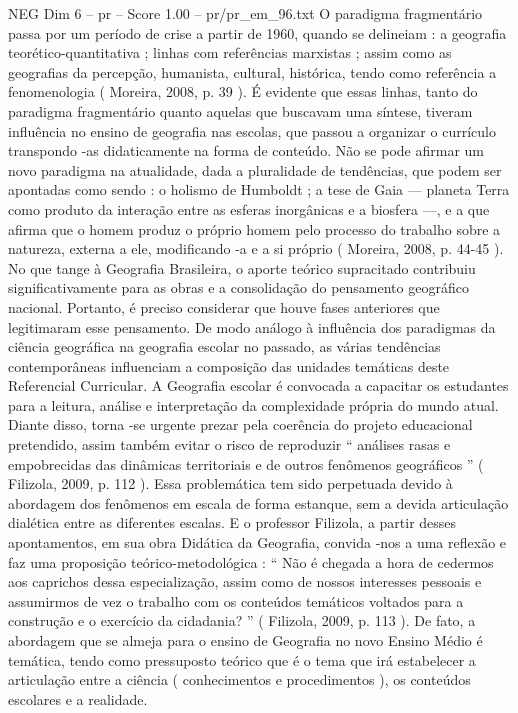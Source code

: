 \begin{textsample}{NEG Dim 6 – pr – Score 1.00 – pr/pr\_em\_96.txt}
O paradigma fragmentário passa por um período de crise a partir de 1960, quando se delineiam : a geografia teorético-quantitativa ; linhas com referências marxistas ; assim como as geografias da percepção, humanista, cultural, histórica, tendo como referência a fenomenologia ( Moreira, 2008, p. 39 ).
É evidente que essas linhas, tanto do paradigma fragmentário quanto aquelas que buscavam uma síntese, tiveram influência no ensino de geografia nas escolas, que passou a organizar o currículo transpondo -as didaticamente na forma de conteúdo.
Não se pode afirmar um novo paradigma na atualidade, dada a pluralidade de tendências, que podem ser apontadas como sendo : o holismo de Humboldt ; a tese de Gaia — planeta Terra como produto da interação entre as esferas inorgânicas e a biosfera —, e a que afirma que o homem produz o próprio homem pelo processo do trabalho sobre a natureza, externa a ele, modificando -a e a si próprio ( Moreira, 2008, p. 44-45 ).
No que tange à Geografia Brasileira, o aporte teórico supracitado contribuiu significativamente para as obras e a consolidação do pensamento geográfico nacional.
Portanto, é preciso considerar que houve fases anteriores que legitimaram esse pensamento.
De modo análogo à influência dos paradigmas da ciência geográfica na geografia escolar no passado, as várias tendências contemporâneas influenciam a composição das unidades temáticas deste Referencial Curricular.
A Geografia escolar é convocada a capacitar os estudantes para a leitura, análise e interpretação da complexidade própria do mundo atual.
Diante disso, torna -se urgente prezar pela coerência do projeto educacional pretendido, assim também evitar o risco de reproduzir “ análises rasas e empobrecidas das dinâmicas territoriais e de outros fenômenos geográficos ” ( Filizola, 2009, p. 112 ).
Essa problemática tem sido perpetuada devido à abordagem dos fenômenos em escala de forma estanque, sem a devida articulação dialética entre as diferentes escalas.
E o professor Filizola, a partir desses apontamentos, em sua obra Didática da Geografia, convida -nos a uma reflexão e faz uma proposição teórico-metodológica : “ Não é chegada a hora de cedermos aos caprichos dessa especialização, assim como de nossos interesses pessoais e assumirmos de vez o trabalho com os conteúdos temáticos voltados para a construção e o exercício da cidadania? ” ( Filizola, 2009, p. 113 ).
De fato, a abordagem que se almeja para o ensino de Geografia no novo Ensino Médio é temática, tendo como pressuposto teórico que é o tema que irá estabelecer a articulação entre a ciência ( conhecimentos e procedimentos ), os conteúdos escolares e a realidade.

\end{textsample}
